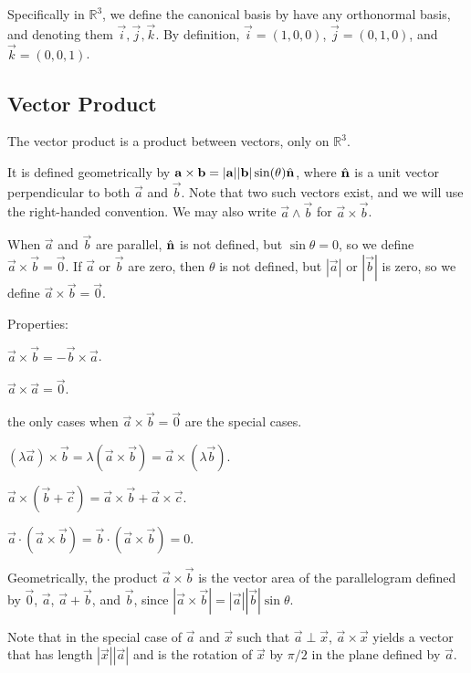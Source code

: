 \documentclass[12pt]{article}
\begin{document}
Specifically in $\mathbb{R}^{3}$, we define the 
canonical basis by have any orthonormal basis,
and denoting them $\vec{i}, \vec{j}, \vec{k}$. By definition,
$\vec{i} = (1,0,0)$, $\vec{j} = (0,1,0)$, and $\vec{k} = (0,0,1)$.

\subsection{Vector Product}

The vector product is a product between vectors,
only on $\mathbb{R}^{3}$.

It is defined geometrically by 
$\mathbf{a}\times\mathbf{b} = |\mathbf{a}||\mathbf{b}|\sin(\theta) \hat{\mathbf{n}}$,
where $\hat{\mathbf{n}}$ is a unit vector perpendicular to both $\vec{a}$ and $\vec{b}$.
Note that two such vectors exist, and we will use the right-handed convention.
We may also write $\vec{a}\wedge\vec{b}$ for $\vec{a}\times\vec{b}$.

When $\vec{a}$ and $\vec{b}$ are parallel,
$\hat{\mathbf{n}}$ is not defined, but
$\sin\theta = 0$, so we define $\vec{a}\times\vec{b} = \vec{0}$.
If $\vec{a}$ or $\vec{b}$ are zero,
then $\theta $ is not defined, but $|\vec{a}|$ or $|\vec{b}|$ is zero,
so we define $\vec{a}\times\vec{b} = \vec{0}$.

Properties:
\begin{compactitem}
\item $\vec{a}\times\vec{b} = -\vec{b}\times\vec{a}$.
\item $\vec{a}\times\vec{a} = \vec{0}$.
\item the only cases when $\vec{a}\times\vec{b} = \vec{0}$ are the special cases.
\item $(\lambda \vec{a})\times\vec{b} = \lambda (\vec{a}\times\vec{b}) = \vec{a}\times(\lambda \vec{b})$.
\item $\vec{a}\times(\vec{b}+\vec{c}) = \vec{a}\times\vec{b} + \vec{a}\times\vec{c}$.
\item $\vec{a}\cdot(\vec{a}\times\vec{b}) = \vec{b}\cdot(\vec{a}\times\vec{b}) = 0$.
\end{compactitem}

Geometrically, the product $\vec{a}\times\vec{b}$ is the
vector area of the parallelogram defined by 
$\vec{0}$, $\vec{a}$, $\vec{a}+\vec{b}$, and $\vec{b}$,
since $|\vec{a}\times\vec{b}| = |\vec{a}||\vec{b}|\sin\theta $.

Note that in the special case of $\vec{a}$ and $\vec{x}$ such that
$\vec{a} \perp \vec{x}$, $\vec{a} \times \vec{x}$
yields a vector that has length $|\vec{x}||\vec{a}|$ and
is the rotation of $\vec{x}$ by $\pi/2$ in the plane 
defined by $\vec{a}$.
\end{document}
